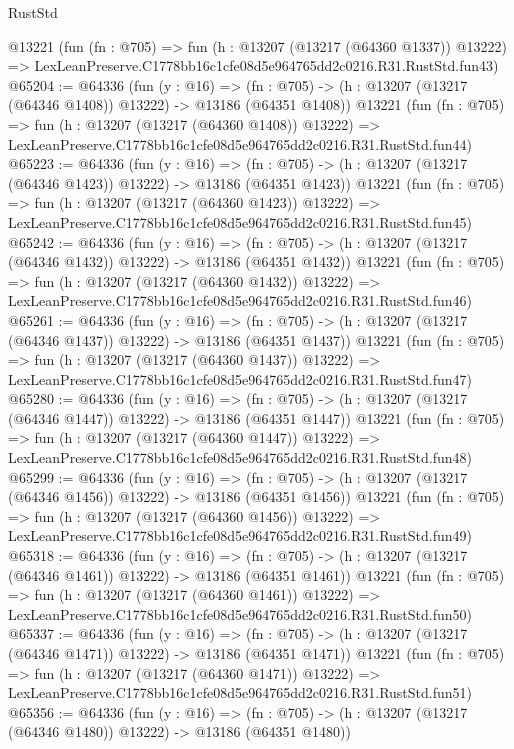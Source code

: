 \begin{lexlean}{RustStd}
\begin{coremodule}
    @13221
    (fun (fn : @705) =>
    fun (h : @13207 (@13217 (@64360 @1337)) @13222) =>
    LexLeanPreserve.C1778bb16c1cfe08d5e964765dd2c0216.R31.RustStd.fun43)
@65204 := @64336
    (fun (y : @16) =>
    (fn : @705) -> (h : @13207 (@13217 (@64346 @1408)) @13222) -> @13186 (@64351 @1408))
    @13221
    (fun (fn : @705) =>
    fun (h : @13207 (@13217 (@64360 @1408)) @13222) =>
    LexLeanPreserve.C1778bb16c1cfe08d5e964765dd2c0216.R31.RustStd.fun44)
@65223 := @64336
    (fun (y : @16) =>
    (fn : @705) -> (h : @13207 (@13217 (@64346 @1423)) @13222) -> @13186 (@64351 @1423))
    @13221
    (fun (fn : @705) =>
    fun (h : @13207 (@13217 (@64360 @1423)) @13222) =>
    LexLeanPreserve.C1778bb16c1cfe08d5e964765dd2c0216.R31.RustStd.fun45)
@65242 := @64336
    (fun (y : @16) =>
    (fn : @705) -> (h : @13207 (@13217 (@64346 @1432)) @13222) -> @13186 (@64351 @1432))
    @13221
    (fun (fn : @705) =>
    fun (h : @13207 (@13217 (@64360 @1432)) @13222) =>
    LexLeanPreserve.C1778bb16c1cfe08d5e964765dd2c0216.R31.RustStd.fun46)
@65261 := @64336
    (fun (y : @16) =>
    (fn : @705) -> (h : @13207 (@13217 (@64346 @1437)) @13222) -> @13186 (@64351 @1437))
    @13221
    (fun (fn : @705) =>
    fun (h : @13207 (@13217 (@64360 @1437)) @13222) =>
    LexLeanPreserve.C1778bb16c1cfe08d5e964765dd2c0216.R31.RustStd.fun47)
@65280 := @64336
    (fun (y : @16) =>
    (fn : @705) -> (h : @13207 (@13217 (@64346 @1447)) @13222) -> @13186 (@64351 @1447))
    @13221
    (fun (fn : @705) =>
    fun (h : @13207 (@13217 (@64360 @1447)) @13222) =>
    LexLeanPreserve.C1778bb16c1cfe08d5e964765dd2c0216.R31.RustStd.fun48)
@65299 := @64336
    (fun (y : @16) =>
    (fn : @705) -> (h : @13207 (@13217 (@64346 @1456)) @13222) -> @13186 (@64351 @1456))
    @13221
    (fun (fn : @705) =>
    fun (h : @13207 (@13217 (@64360 @1456)) @13222) =>
    LexLeanPreserve.C1778bb16c1cfe08d5e964765dd2c0216.R31.RustStd.fun49)
@65318 := @64336
    (fun (y : @16) =>
    (fn : @705) -> (h : @13207 (@13217 (@64346 @1461)) @13222) -> @13186 (@64351 @1461))
    @13221
    (fun (fn : @705) =>
    fun (h : @13207 (@13217 (@64360 @1461)) @13222) =>
    LexLeanPreserve.C1778bb16c1cfe08d5e964765dd2c0216.R31.RustStd.fun50)
@65337 := @64336
    (fun (y : @16) =>
    (fn : @705) -> (h : @13207 (@13217 (@64346 @1471)) @13222) -> @13186 (@64351 @1471))
    @13221
    (fun (fn : @705) =>
    fun (h : @13207 (@13217 (@64360 @1471)) @13222) =>
    LexLeanPreserve.C1778bb16c1cfe08d5e964765dd2c0216.R31.RustStd.fun51)
@65356 := @64336
    (fun (y : @16) =>
    (fn : @705) -> (h : @13207 (@13217 (@64346 @1480)) @13222) -> @13186 (@64351 @1480))

\end{coremodule}
\end{lexlean}
